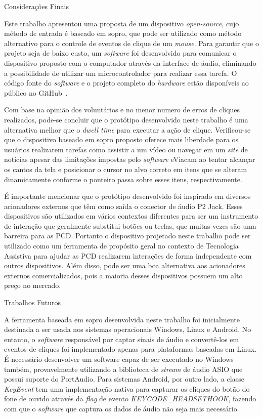 \begin{chapter}{Considerações Finais}

Este trabalho apresentou uma proposta de um dispositivo \textit{open-source},
cujo método de entrada é baseado em sopro, que pode ser utilizado como método
alternativo para o controle de eventos de clique de um \textit{mouse}. Para
garantir que o projeto seja de baixo custo, um \textit{software} foi desenvolvido
para comunicar o dispositivo proposto com o computador através da interface de
áudio, eliminando a possibilidade de utilizar um microcontrolador para realizar
essa tarefa. O código fonte do \textit{software} e o projeto completo do
\textit{hardware} estão disponíveis ao público no GitHub~\cite{ErickGit}.

Com base na opinião dos voluntários e no menor numero de erros de cliques
realizados, pode-se concluir que o protótipo desenvolvido neste trabalho é uma
alternativa melhor que o \textit{dwell time} para executar a ação
de clique. Verificou-se que o dispositivo baseado em sopro proposto oferece mais
liberdade para os usuários realizarem tarefas como assistir a um vídeo ou
navegar em um \textit{site} de notícias apesar das limitações impostas pelo
\textit{software} eViacam ao tentar alcançar os cantos da tela e posicionar o
cursor no alvo correto em itens que se alteram dinamicamente conforme o ponteiro
passa sobre esses itens, respectivamente.

É importante mencionar que o protótipo desenvolvido foi inspirado em diversos
acionadores externos que têm como saída o conector de áudio P2 Jack. Esses
dispositivos são utilizados em vários contextos diferentes para ser um
instrumento de interação que geralmente substitui botões ou teclas, que muitas
vezes são uma barreira para as PCD. Portanto o dispositivo projetado neste
trabalho pode ser utilizado como um ferramenta de propósito geral no contexto de
Tecnologia Assistiva para ajudar as PCD realizarem interações de forma
independente com outros dispositivos. Além disso, pode ser uma boa alternativa
aos acionadores externos comercializados, pois a maioria desses dispositivos
possuem um alto preço no mercado.

\begin{section}{Trabalhos Futuros}

A ferramenta baseada em sopro desenvolvida neste trabalho foi inicialmente
destinada a ser usada nos sistemas operacionais Windows, Linux e Android. No
entanto, o \textit{software} responsável por captar sinais de áudio e
convertê-los em eventos de cliques foi implementado apenas para plataformas
baseadas em Linux. É necessário desenvolver um software capaz de ser executado
no Windows também, provavelmente utilizando a biblioteca de \textit{stream} de
áudio ASIO que possui suporte do PortAudio. Para sistemas Android, por outro
lado, a classe \emph{KeyEvent} tem uma implementação nativa para capturar os
cliques do botão do fone de ouvido através da \textit{flag} de evento
\emph{KEYCODE\_HEADSETHOOK}, fazendo com que o \textit{software} que captura os
dados de áudio não seja mais necessário.


\end{section}
\end{chapter}
